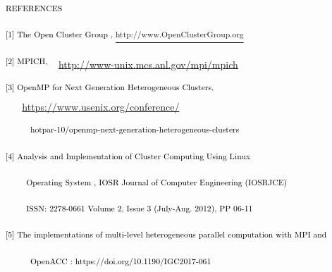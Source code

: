 \documentclass[a4paper]{article}
\newcommand\textstyleFootnoteSymbol[1]{\textsuperscript{#1}}
\begin{document}
\bigskip


\bigskip


\bigskip


\bigskip


\bigskip


\bigskip


\bigskip


\bigskip


\bigskip


\bigskip


\bigskip


\bigskip


\bigskip


\bigskip


\bigskip


\bigskip


\bigskip


\bigskip


\bigskip


\bigskip

{\centering
\textstyleFootnoteSymbol{\textcolor{black}{REFERENCES}}
\par}

\textstyleFootnoteSymbol{\textcolor{black}{[1] The Open Cluster Group ,
}}\href{http://www.OpenClusterGroup.org/}{\textstyleFootnoteSymbol{http://www.OpenClusterGroup.org}}

\textstyleFootnoteSymbol{\textcolor{black}{[2] MPICH, \ \ }}\url{http://www-unix.mcs.anl.gov/mpi/mpich}

\textstyleFootnoteSymbol{\textcolor{black}{[3] OpenMP for Next Generation Heterogeneous Clusters,
\ \ \ \ }}\url{https://www.usenix.org/conference/}\textstyleFootnoteSymbol{\textcolor{black}{ \ \ \ \ \ \ \ }}

\textstyleFootnoteSymbol{\textcolor{black}{\ \ \ \ \ \ hotpar-10/openmp-next-generation-heterogeneous-clusters}}

\textstyleFootnoteSymbol{\textcolor{black}{[4] }\textcolor{black}{Analysis and Implementation of Cluster Computing Using
Linux}}

\textstyleFootnoteSymbol{\textcolor{black}{\ \ \ \ \ Operating System , IOSR Journal of Computer Engineering (IOSRJCE)}}

\textstyleFootnoteSymbol{\textcolor{black}{\ \ \ \ \ ISSN: 2278-0661 Volume 2, Issue 3 (July-Aug. 2012), PP 06-11}}

\textstyleFootnoteSymbol{\textcolor{black}{[5] The implementations of multi-level heterogeneous parallel computation
with MPI and }}

\textstyleFootnoteSymbol{\textcolor{black}{\ \ \ \ \ \ OpenACC : https://doi.org/10.1190/IGC2017-061}}
\end{document}
